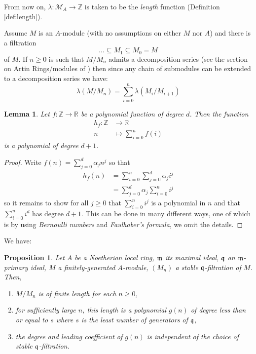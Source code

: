 \documentclass[12pt]{article}
\theoremstyle{plain}
\newtheorem{proposition}[thm]{Proposition}
\newtheorem{lemma}[thm]{Lemma}
\theoremstyle{definition}
\newcommand{\bb}[1]{\mathbb{#1}}
\newcommand{\call}[1]{\mathcal{#1}}
\newcommand{\lto}{\longrightarrow}
\begin{document}
	From now on, $\lambda: \call{M}_A \lto \bb{Z}$ is taken to be the \emph{length} function (Definition \ref{def:length}).
	
	Assume $M$ is an $A$-module (with no assumptions on either $M$ nor $A$) and there is a filtration
	\[\hdots \subseteq M_1 \subseteq M_0 = M\] of $M$. If $n \geq 0$ is such that $M/M_n$ admits a decomposition series (see the section on Artin Rings/modules of \cite{com_alg_notes}) then since any chain of submodules can be extended to a decomposition series we have:
	\begin{equation}
		\label{eq:sum_lengths}
		\lambda(M/M_n) = \sum_{i = 0}^n\lambda (M_i/M_{i+1})
	\end{equation}
	\begin{lemma}
		\label{lem:polynomial_sum}
		Let $f: \bb{Z} \lto \bb{R}$ be a polynomial function of degree $d$. Then the function
		\begin{align*}
			h_f: \bb{Z} &\lto \bb{R}\\
			n &\mapsto \sum_{i = 0}^nf(i)
		\end{align*}
		is a polynomial of degree $d+1$.
	\end{lemma}
	\begin{proof}
		Write $f(n) = \sum_{j = 0}^d \alpha_j n^j$ so that
		\begin{align*}
			h_f(n) &= \sum_{i = 0}^n \sum_{j = 0}^d \alpha_j i^j\\
			&= \sum_{j = 0}^d \alpha_j\sum_{i = 0}^n i^j
		\end{align*}
		so it remains to show for all $j \geq 0$ that $\sum_{i = 0}^n i^j$ is a polynomial in $n$ and that $\sum_{i = 0}^ni^d$ has degree $d+1$. This can be done in many different ways, one of which is by using \emph{Bernoulli numbers} and \emph{Faulhaber's formula}, we omit the details.
	\end{proof}
	We have:
	\begin{proposition}
		\label{prop:Noeth_primary_fin_gen_filtration}
		Let $A$ be a Noetherian local ring, $\frak{m}$ its maximal ideal, $\frak{q}$ an $\frak{m}$-primary ideal, $M$ a finitely-generated $A$-module, $(M_n)$ a stable $\frak{q}$-filtration of $M$. Then,
		\begin{enumerate}
			\item\label{prop:finite_length} $M/M_n$ is of finite length for each $n \geq 0$,
			\item\label{prop:polynomial} for sufficiently large $n$, this length is a polynomial $g(n)$ of degree less than or equal to $s$ where $s$ is the least number of generators of $\frak{q}$,
			\item\label{prop:leading_coefficient} the degree and leading coefficient of $g(n)$ is independent of the choice of stable $\frak{q}$-filtration.
		\end{enumerate}
	\end{proposition}
\end{document}
